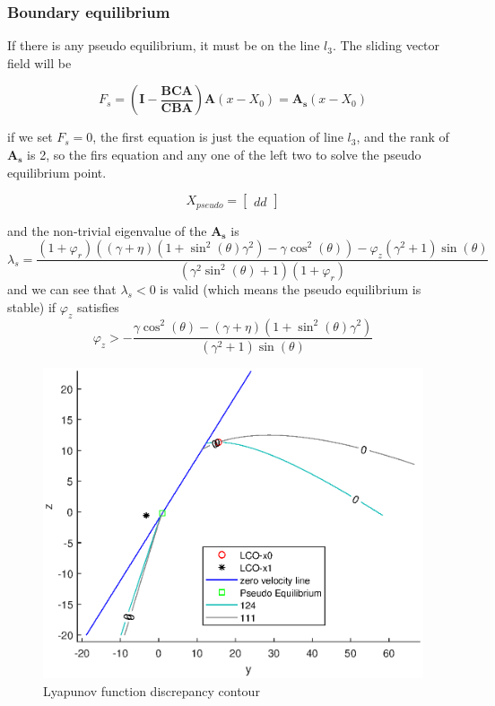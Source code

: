 \documentclass[a4paper,10pt]{article}
\begin{document}
%
\subsubsection{Boundary equilibrium}

If there is any pseudo equilibrium, it must be on the line $l_3$. The sliding vector field will be 

\begin{equation}
F_s = (\mathbf{I} - \frac{\mathbf{BCA}}{\mathbf{CBA}})\mathbf{A}(x-X_0) = \mathbf{A_s}(x-X_0) 
\end{equation} 

if we set $F_s = 0$, the first equation is just the equation of line $l_3$, and the rank of $\mathbf{A_s}$ is 2, so the firs equation and any one of the left two to solve the pseudo equilibrium point.

$$
X_{pseudo} = 
\begin{bmatrix}
dd
\end{bmatrix}
$$

and the non-trivial eigenvalue of the $\mathbf{A_s}$ is 
\begin{equation}
 \lambda_{s} = \frac
 {
 (1+\varphi_{r}) 
 \left((\gamma+\eta) (1+\sin^{2}(\theta) \gamma^{2})-\gamma \cos^{2}(\theta)
 \right)
 -\varphi_{z} (\gamma^{2}+1) \sin(\theta)	
 }
%
{
(\gamma^{2} \sin^{2}(\theta)+1) (1+\varphi_{r})	
} 
\end{equation}
and we can see that $\lambda_s < 0$ is valid (which means the pseudo equilibrium is stable) if $\varphi_{z}$ satisfies
\begin{equation}
\varphi_{z} > - \frac{ \gamma \cos^{2}(\theta) - 
	(\gamma+\eta) (1+\sin^{2}(\theta) \gamma^{2})
}
{
	(\gamma^{2}+1) \sin(\theta)
}
\end{equation}
%
\begin{figure}[h]
	\centering
	\includegraphics[width= 0.6 \textwidth]{BEB_Explanation/figures/Lyapu_contour.eps}
	\caption{Lyapunov function discrepancy contour}
	\label{fig:Lyapu_contour}
\end{figure}
\end{document}
